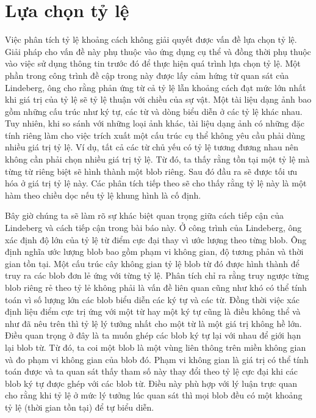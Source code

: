 \documentclass[12pt, a4paper]{article}
\begin{document}
\section{Lựa chọn tỷ lệ} %
\label{sec:2.5}
Việc phân tích tỷ lệ khoảng cách không giải quyết được vấn đề lựa chọn tỷ lệ. Giải pháp cho vấn đề này phụ thuộc vào ứng dụng cụ thể và đồng thời phụ thuộc vào việc sử dụng thông tin trước đó để thực hiện quá trình lựa chọn tỷ lệ. Một phần trong công trình đề cập trong này được lấy cảm hứng từ quan sát của Lindeberg, ông cho rằng phản ứng từ cả tỷ lệ lẫn khoảng cách đạt mức lớn nhất khi giá trị của tỷ lệ sẽ tỷ lệ thuận với chiều của sự vật. Một tài liệu dạng ảnh bao gồm những cấu trúc như ký tự, các từ và dòng biểu diễn ở các tỷ lệ khác nhau. Tuy nhiên, khi so sánh với những loại ảnh khác, tài liệu dạng ảnh có những đặc tính riêng làm cho việc trích xuất một cấu trúc cụ thể không yêu cầu phải dùng nhiều giá trị tỷ lệ. Ví dụ, tất cả các từ chủ yếu có tỷ lệ tương đương nhau nên không cần phải chọn nhiều giá trị tỷ lệ. Từ đó, ta thấy rằng tồn tại một tỷ lệ mà từng từ riêng biệt sẽ hình thành một blob riêng. Sau đó đầu ra sẽ được tối ưu hóa ở giá trị tỷ lệ này. Các phân tích tiếp theo sẽ cho thấy rằng tỷ lệ này là một hàm theo chiều dọc nếu tỷ lệ khung hình là cố định.\par

Bây giờ chúng ta sẽ làm rõ sự khác biệt quan trọng giữa cách tiếp cận của Lindeberg và cách tiếp cận trong bài báo này. Ở công trình của Lindeberg, ông xác định độ lớn của tỷ lệ từ điểm cực đại thay vì ước lượng theo từng blob. Ông định nghĩa ước lượng blob bao gồm phạm vi không gian, độ tương phản và thời gian tồn tại. Một cấu trúc cây không gian tỷ lệ blob từ đó được hình thành để truy ra các blob đơn lẻ ứng với từng tỷ lệ. Phân tích chỉ ra rằng truy ngược từng blob riêng rẻ theo tỷ lẻ không phải là vấn đề liên quan cũng như khó có thể tính toán vì số lượng lớn các blob biểu diễn các ký tự và các từ. Đồng thời việc xác định liệu điểm cực trị ứng với một từ hay một ký tự cũng là điều không thể và như đã nêu trên thì tỷ lệ lý tưởng nhất cho một từ là một giá trị không hề lớn. Điều quan trọng ở đây là ta muốn ghép các blob ký tự lại với nhau để giới hạn lại blob từ. Từ đó, ta coi một blob là một vùng liên thông trên miền không gian và đo phạm vi không gian của blob đó. Phạm vi không gian là giá trị có thể tính toán được và ta quan sát thấy tham số này thay đổi theo tỷ lệ cực đại khi các blob ký tự được ghép với các blob từ. Điều này phù hợp với lý luận trực quan cho rằng khi tỷ lệ ở mức lý tưởng lúc quan sát thì mọi blob đều có một khoảng tỷ lệ (thời gian tồn tại) để tự biểu diễn.\par
\end{document}
